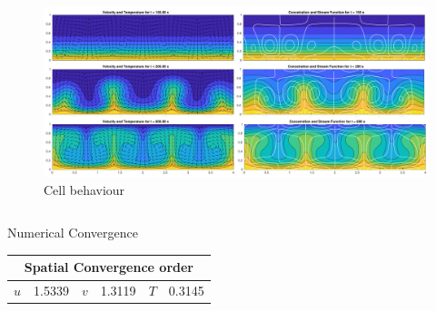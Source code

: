 \documentclass[final]{beamer}
\newlength{\onecolwid}
\newlength{\twocolwid}
\begin{document}
\begin{frame}[t]
\begin{columns}[t]
\begin{column}{\twocolwid}
\begin{columns}[t,totalwidth=\twocolwid]
\begin{column}{\onecolwid}

\end{column} %

\end{columns} %


\begin{figure}
\includegraphics[width=1.0\linewidth]{images/figure1.pdf}
\caption{Cell behaviour}
\end{figure}

\begin{columns}[t,totalwidth=\twocolwid] %

\begin{column}{\onecolwid} %


\begin{block}{Numerical Convergence}
\begin{table}
\begin{tabular}{|c|c|c|c|c|c|}
\hline 
\multicolumn{6}{|c|}{\textbf{Spatial Convergence order}}\tabularnewline
\hline 
$u$ & 1.5339 & $v$ & 1.3119 & $T$ & 0.3145\tabularnewline
\hline 
\end{tabular}
\end{table}
\end{block}


\end{column}
\end{columns}
\end{column}
\end{columns}
\end{frame}
\end{document}
